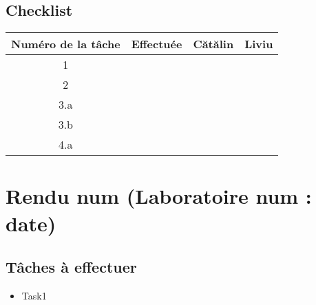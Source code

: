 \documentclass{article}
\begin{document}
    \subsection{Checklist}
    \begin{center}
        \begin{tabular}{|c|c|c|c|}
            \hline
            Numéro de la tâche & Effectuée & Cătălin & Liviu \\
            \hline
            \hline 1 &   &   &   \\ 
            \hline 2 &   &   &   \\
            \hline 3.a &   &   &   \\
            \hline 3.b &   &   &   \\
            \hline 4.a &   &   &   \\
            \hline
        \end{tabular}
    \end{center}
    \newpage

    \section{Rendu num (Laboratoire num : date) }
    \subsection{Tâches à effectuer}
    \begin{itemize}
        \item Task1
    \end{itemize}
    \newpage
\end{document}
